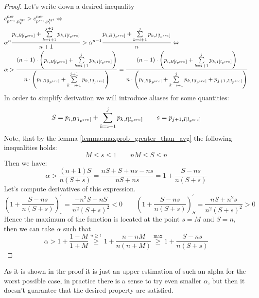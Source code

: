 \begin{proof} Let's write down a desired inequality
    \begin{align*}
         & c_{p^{src}, p_2^{tgt}}^{ner} > c_{p^{src}, p_1^{tgt}}^{ner} \Leftrightarrow \\
         & \alpha^{n}
        \frac{
            p_{i, B[l_{p^{src}}]} +
            \sum\limits_{k = i + 1}^{j + 1} p_{k, I[l_{p^{src}}]}
        }
        {n + 1} >
        \alpha^{n - 1}
        \frac{
            p_{i, B[l_{p^{src}}]} +
            \sum\limits_{k = i + 1}^{j} p_{k, I[l_{p^{src}}]}
        }
        {n}
        \Leftrightarrow                                                                \\
         & \alpha >
        \frac
        {(n+1) \cdot \left( p_{i, B[l_{p^{src}}]} +
            \sum\limits_{k = i + 1}^{j} p_{k, I[l_{p^{src}}]} \right)}
        {
            n \cdot \left( p_{i, B[l_{p^{src}}]} +
            \sum\limits_{k = i + 1}^{j + 1} p_{k, I[l_{p^{src}}]} \right)}
        =
        \frac
        {(n+1) \cdot \left( p_{i, B[l_{p^{src}}]} +
            \sum\limits_{k = i + 1}^{j} p_{k, I[l_{p^{src}}]} \right)}
        {
            n \cdot \left( p_{i, B[l_{p^{src}}]} +
            \sum\limits_{k = i + 1}^{j} p_{k, I[l_{p^{src}}]} + p_{j+1, I[l_{p^{src}}]} \right)}
    \end{align*}
    In order to simplify derivation we will introduce aliases for some quantities:
    \[
        S = p_{i, B[l_{p^{src}}]}  + \sum\limits_{k = i + 1}^{j} p_{k, I[l_{p^{src}}]} \qquad
        s = p_{j+1, I[l_{p^{src}}]}
    \]
    Note, that by the lemma \ref{lemma:maxprob_greater_than_avg} the following
    inequalities holds:
    \begin{equation} \label{eq:ner_sum_ineq}
        M \leq s \leq 1 \qquad nM \leq S \leq n
    \end{equation}
    Then we have:
    \begin{equation*}
        \alpha > \frac{(n + 1) S}{n (S + s)} =
        \frac{nS + S + ns - ns}{nS + ns} =
        1 + \frac{S - ns}{n(S + s)}
    \end{equation*}
    Let's compute derivatives of this expression.
    \begin{equation*}
        \left( 1 + \frac{S - ns}{n(S + s)} \right)_s^{'} =
        \frac{-n^2S - nS}{n^2 (S + s)^2} < 0
        \qquad
        \left( 1 + \frac{S - ns}{n(S + s)} \right)_S^{'}
        = \frac{nS + n^2s}{n^2 (S + s)^2} > 0
    \end{equation*}
    Hence the maximum of the function is located at the point
    \( s = M \) and \( S = n \), then we can take \( \alpha \) such that
    \begin{equation*}
        \alpha > 1 + \frac{1 - M}{1 + M}
        \stackrel{n \geq 1}{\geq}
        1 + \frac{n - nM}{n(n + M)}
        \stackrel{\max}{\geq}
        1 + \frac{S - ns}{n(S + s)}
    \end{equation*}
\end{proof}
As it is shown in the proof it is just an upper estimation of such an alpha for the worst possible case,
in practice there is a sense to try even smaller \( \alpha \), but then it doesn't guarantee that the
desired property are satisfied.

